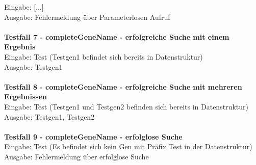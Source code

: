 \documentclass[]{article}
\begin{document}
Eingabe: [...]\\
Ausgabe: Fehlermeldung über Parameterlosen Aufruf\\
\\
\textbf{Testfall 7 - completeGeneName - erfolgreiche Suche mit einem Ergebnis}\\
Eingabe: Test (Testgen1 befindet sich bereits in Datenstruktur)\\
Ausgabe: Testgen1\\
\\
\textbf{Testfall 8 - completeGeneName - erfolgreiche Suche mit mehreren Ergebnissen}\\
Eingabe: Test (Testgen1 und Testgen2 befinden sich bereits in Datenstruktur)\\
Ausgabe: Testgen1, Testgen2\\
\\
\textbf{Testfall 9 - completeGeneName - erfolglose Suche}\\
Eingabe: Test (Es befindet sich kein Gen mit Präfix Test in der Datenstruktur)\\
Ausgabe: Fehlermeldung über erfolglose Suche
\end{document}
